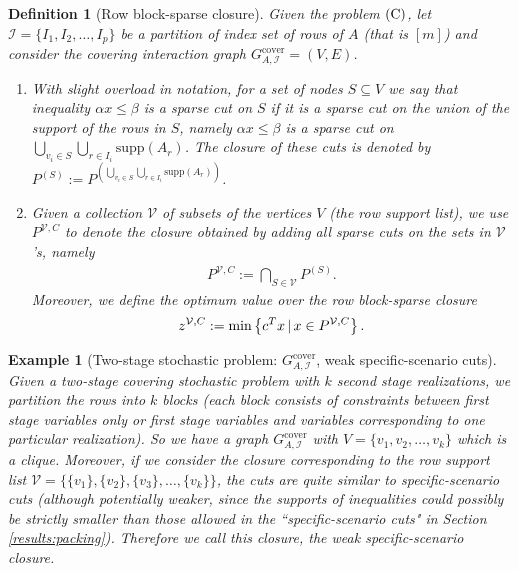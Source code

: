 \documentclass[smallextended]{svjour3}
\newtheorem{definition}[proposition]{Definition}
\newtheorem{example}[proposition]{Example}
\begin{document}
\begin{definition}[Row block-sparse closure]\label{defn:rowsparse}
Given the problem $\textup{(C)}$, let $\mathcal{I} = \{I_1, I_2, \dots, I_p\}$ be a partition of index set of rows of $A$ (that is $[m]$) and consider the covering interaction graph ${G^{\textrm{cover}}_{A, {\mathcal{I}}}} = (V,E)$.
	\begin{enumerate}
		\item With slight overload in notation, for a set of nodes $S \subseteq V$ we say that inequality $\alpha x \le \beta$ is a \emph{sparse cut on $S$} if it is a sparse cut on the union of the support of the rows in $S$, namely $\alpha x \le \beta$ is a sparse cut on $\bigcup_{v_i \in S} \bigcup_{r \in I_i} {\textrm{supp}}(A_r)$. The closure of these cuts is denoted by $P^{(S)} := P^{(\bigcup_{v_i \in S} \bigcup_{r \in I_i} {\textrm{supp}}(A_r))}$.
		\item Given a collection ${\mathcal{V}}$ of subsets of the vertices $V$ (the \emph{row support list}), we use $P^{{\mathcal{V}},C}$ to denote the closure obtained by adding all sparse cuts on the sets in ${\mathcal{V}}$'s, namely
				\begin{align*}
			P^{\mathcal{V}, C} := \bigcap_{S \in {\mathcal{V}}} P^{(S)}.
		\end{align*}  
	Moreover, we define the optimum value over the row block-sparse closure $$z^{\mathcal{V}, C} := \textup{min} \left\{c^Tx \,|\, x \in P^{\mathcal{V},C}\right\}.$$
	\end{enumerate}
\end{definition}

\begin{example}[Two-stage stochastic problem: ${G^{\textrm{cover}}_{A, {\mathcal{I}}}}$, weak specific-scenario cuts]\label{ex:stoccover}
Given a two-stage covering stochastic problem with $k$ second stage realizations, we partition the rows into $k$ blocks (each block consists of constraints between first stage variables only or first stage variables and variables corresponding to one particular realization). So we have a graph ${G^{\textrm{cover}}_{A, {\mathcal{I}}}}$ with $V = \{v_1, v_2, \dots, v_{k}\}$ which is a clique. Moreover, if we consider the closure corresponding to the row support list $\mathcal{V} = \{ \{v_1\}, \{v_2\}, \{v_3\}, \dots, \{v_k\}\}$, the cuts are quite similar to specific-scenario cuts (although potentially weaker, since the supports of inequalities could possibly be strictly smaller than those allowed in the ``specific-scenario cuts" in Section \ref{results:packing}). Therefore we call this closure, the weak specific-scenario closure.
\end{example}
\end{document}
